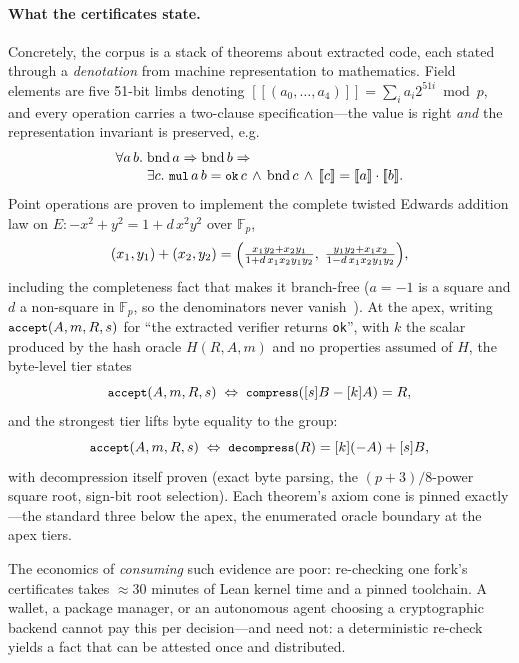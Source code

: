 \documentclass[10pt,twocolumn]{article}
\newcommand{\code}[1]{\texttt{\small #1}}
\newcommand{\den}[1]{[\![#1]\!]}
\begin{document}
\paragraph{What the certificates state.} Concretely, the corpus is a
stack of theorems about extracted code, each stated through a
\emph{denotation} from machine representation to mathematics. Field
elements are five 51-bit limbs denoting
$\den{(a_0,\dots,a_4)}=\sum_i a_i2^{51i}\bmod p$, and every
operation carries a two-clause specification---the value is right
\emph{and} the representation invariant is preserved, e.g.
\begin{align*}
\footnotesize
\forall a\,b.\ &\mathrm{bnd}\,a \Rightarrow \mathrm{bnd}\,b \Rightarrow{}\\[-2pt]
&\exists c.\ \code{mul}\,a\,b = \code{ok}\,c \,\wedge\, \mathrm{bnd}\,c
\,\wedge\, \den{c} = \den{a}\cdot\den{b}.
\end{align*}
Point operations are proven to implement the complete twisted Edwards
addition law on
$E : -x^2+y^2 = 1+d\,x^2y^2$ over $\mathbb{F}_p$,
\begin{equation*}
\small
(x_1,y_1)+(x_2,y_2)=
\Bigl(\tfrac{x_1y_2+x_2y_1}{1+d\,x_1x_2y_1y_2},\;
\tfrac{y_1y_2+x_1x_2}{1-d\,x_1x_2y_1y_2}\Bigr),
\end{equation*}
including the completeness fact that makes it branch-free ($a=-1$ is a
square and $d$ a non-square in $\mathbb{F}_p$, so the denominators never
vanish~\cite{bernsteinlange}).
At the apex, writing $\code{accept}(A,m,R,s)$ for ``the extracted
verifier returns \code{ok}'', with $k$ the scalar produced by the hash
oracle $H(R,A,m)$ and no properties assumed of $H$, the byte-level tier
states
\begin{equation*}
\footnotesize
\code{accept}(A,m,R,s) \;\Leftrightarrow\; \code{compress}([s]B-[k]A) = R,
\end{equation*}
and the strongest tier lifts byte equality to the group:
\begin{equation*}
\footnotesize
\code{accept}(A,m,R,s) \;\Leftrightarrow\; \code{decompress}(R) = [k](-A)+[s]B,
\end{equation*}
with decompression itself proven (exact byte parsing, the
$(p{+}3)/8$-power square root, sign-bit root selection). Each theorem's
axiom cone is pinned exactly---the standard three below the apex, the
enumerated oracle boundary at the apex tiers.

The economics of \emph{consuming} such evidence are poor: re-checking
one fork's certificates takes $\approx$30 minutes of Lean kernel time
and a pinned toolchain. A wallet, a package manager, or an autonomous
agent choosing a cryptographic backend cannot pay this per
decision---and need not: a deterministic re-check yields a fact that can
be attested once and distributed.
\end{document}
